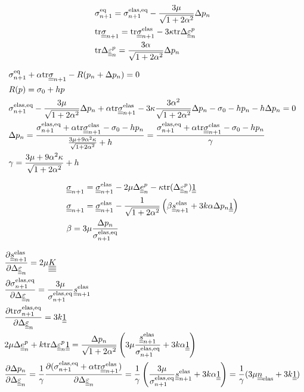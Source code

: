 \documentclass[12pt]{article}
\begin{document}
\begin{appendices}
    \begin{align}
        & \sigmaeqn = \sigmaeqnelas - \frac{3\mu}{\sqrt{1 + 2\alpha^2}}\Delta p_n \\
        & \mtr \uusigman = \mtr \uusigmanelas - 3\kappa \mtr \Deltaepsp \\
        & \mtr \Deltaepsp = \frac{3\alpha}{\sqrt{1 + 2\alpha^2}} \Delta p_n
    \end{align}

    \begin{align}
        & \sigmaeqn + \alpha \mtr \uusigman - R(p_n + \Delta p_n) = 0 \\
        & R(p) = \sigma_0 + h p \\
        & \sigmaeqnelas - \frac{3\mu}{\sqrt{1 + 2\alpha^2}}\Delta p_n + \alpha \mtr \uusigmanelas - 3\kappa \frac{3\alpha^2}{\sqrt{1 + 2\alpha^2}} \Delta p_n - \sigma_0 - h p_n - h \Delta p_n = 0 \\
        & \Delta p_n = \frac{ \sigmaeqnelas + \alpha \mtr \uusigmanelas - \sigma_0 - h p_n}{ \frac{3\mu + 9\alpha^2\kappa}{\sqrt{1 + 2\alpha^2}} + h} = \frac{ \sigmaeqnelas + \alpha \mtr \uusigmanelas - \sigma_0 - h p_n}{ \gamma } \\
        & \gamma = \frac{3\mu + 9\alpha^2\kappa}{\sqrt{1 + 2\alpha^2}} + h
    \end{align}

    \begin{align}
        & \uusigma_{n+1} = \uusigma_{n+1}^\text{elas} - 2\mu \Deltaep - \kappa \mtr (\Deltaepsp) \uuUnit \\
        & \uusigma_{n+1} = \uusigma_{n+1}^\text{elas} - \frac{1}{\sqrt{1 + 2\alpha^2}}\left( \beta \uusnelas + 3k\alpha \Delta p_n \uuUnit \right) \\
        & \beta = 3\mu\frac{\Delta p_n}{\sigmaeqnelas} 
    \end{align}

    \begin{align}
        & \frac{\partial \uusnelas{}}{\partial \Deltaeps} = 2\mu \uuuuK\\
        & \frac{\partial \sigmaeqnelas{}}{\partial \Deltaeps} = \frac{3\mu}{\sigmaeqnelas}\uusnelas \\
        & \frac{\partial\mtr\sigmaeqnelas}{\partial\Deltaeps} = 3k\uuUnit \\
        & 2\mu\Deltaep + k\mtr\Deltaepsp\uuUnit = \frac{\Delta p_n}{\sqrt{1 + 2\alpha^2}} \left( 3\mu \frac{\uusnelas}{\sigmaeqnelas} + 3k\alpha \uuUnit  \right) \\
        & \frac{\partial\Delta p_n}{\partial\Deltaeps} = \frac{1}{\gamma} \frac{\partial(\sigmaeqnelas + \alpha \mtr \uusigmanelas)}{\partial\Deltaeps} = \frac{1}{\gamma} \left( \frac{3\mu}{\sigmaeqnelas}\uusnelas + 3k\alpha\uuUnit \right) = \frac{1}{\gamma}(3\mu \uunelas + 3k\uuUnit)
    \end{align}


\end{appendices}
\end{document}
